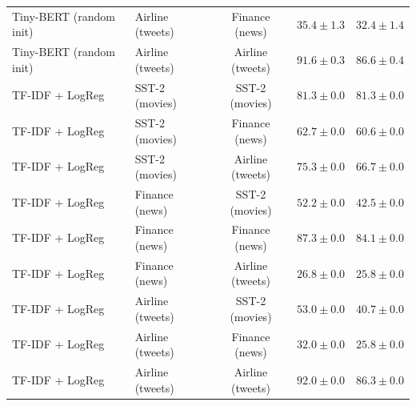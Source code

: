 \begin{table}[t]
{\begin{tabular}{llccc}
Tiny-BERT (random init) & Airline (tweets) & Finance (news) & $35.4\pm1.3$ & $32.4\pm1.4$ \\
Tiny-BERT (random init) & Airline (tweets) & Airline (tweets) & $91.6\pm0.3$ & $86.6\pm0.4$ \\
TF-IDF + LogReg & SST-2 (movies) & SST-2 (movies) & $81.3\pm0.0$ & $81.3\pm0.0$ \\
TF-IDF + LogReg & SST-2 (movies) & Finance (news) & $62.7\pm0.0$ & $60.6\pm0.0$ \\
TF-IDF + LogReg & SST-2 (movies) & Airline (tweets) & $75.3\pm0.0$ & $66.7\pm0.0$ \\
TF-IDF + LogReg & Finance (news) & SST-2 (movies) & $52.2\pm0.0$ & $42.5\pm0.0$ \\
TF-IDF + LogReg & Finance (news) & Finance (news) & $87.3\pm0.0$ & $84.1\pm0.0$ \\
TF-IDF + LogReg & Finance (news) & Airline (tweets) & $26.8\pm0.0$ & $25.8\pm0.0$ \\
TF-IDF + LogReg & Airline (tweets) & SST-2 (movies) & $53.0\pm0.0$ & $40.7\pm0.0$ \\
TF-IDF + LogReg & Airline (tweets) & Finance (news) & $32.0\pm0.0$ & $25.8\pm0.0$ \\
TF-IDF + LogReg & Airline (tweets) & Airline (tweets) & $92.0\pm0.0$ & $86.3\pm0.0$ \\
\bottomrule
\end{tabular}}
\end{table}
